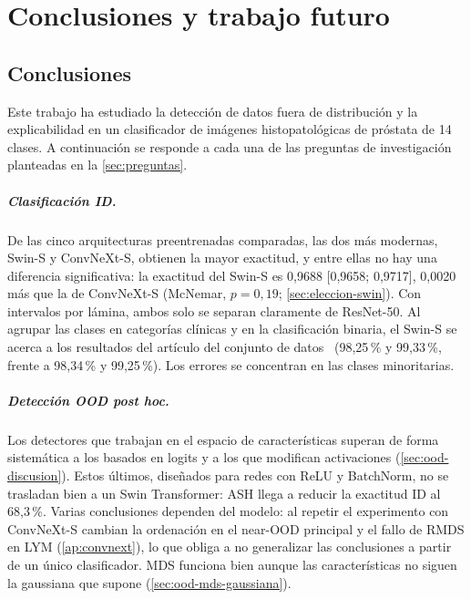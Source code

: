 %

\chapter{Conclusiones y trabajo futuro}\label{cap:conclusiones}

\section{Conclusiones}\label{sec:conclusiones}

Este trabajo ha estudiado la detección de datos fuera de distribución y la explicabilidad en un clasificador de imágenes histopatológicas de próstata de 14 clases. A continuación se responde a cada una de las preguntas de investigación planteadas en la \cref{sec:preguntas}.

\paragraph{Clasificación ID.} De las cinco arquitecturas preentrenadas comparadas, las dos más modernas, Swin-S y ConvNeXt-S, obtienen la mayor exactitud, y entre ellas no hay una diferencia significativa: la exactitud del Swin-S es 0,9688 [0,9658; 0,9717], 0,0020 más que la de ConvNeXt-S (McNemar, $p = 0{,}19$; \cref{sec:eleccion-swin}). Con intervalos por lámina, ambos solo se separan claramente de ResNet-50. Al agrupar las clases en categorías clínicas y en la clasificación binaria, el Swin-S se acerca a los resultados del artículo del conjunto de datos~\cite{ayensa2026} (98,25\,\% y 99,33\,\%, frente a 98,34\,\% y 99,25\,\%). Los errores se concentran en las clases minoritarias.

\paragraph{Detección OOD post hoc.} Los detectores que trabajan en el espacio de características superan de forma sistemática a los basados en logits y a los que modifican activaciones (\cref{sec:ood-discusion}). Estos últimos, diseñados para redes con ReLU y BatchNorm, no se trasladan bien a un Swin Transformer: ASH llega a reducir la exactitud ID al 68,3\,\%. Varias conclusiones dependen del modelo: al repetir el experimento con ConvNeXt-S cambian la ordenación en el near-OOD principal y el fallo de RMDS en LYM (\cref{ap:convnext}), lo que obliga a no generalizar las conclusiones a partir de un único clasificador. MDS funciona bien aunque las características no siguen la gaussiana que supone (\cref{sec:ood-mds-gaussiana}).

